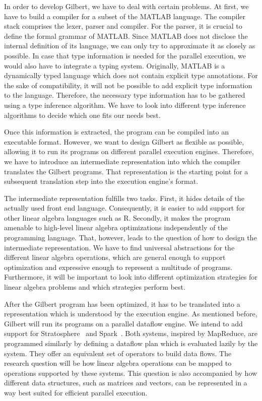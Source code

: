 In order to develop Gilbert, we have to deal with certain problems.
At first, we have to build a compiler for a subset of the MATLAB language.
The compiler stack comprises the lexer, parser and compiler.
For the parser, it is crucial to define the formal grammar of MATLAB.
Since MATLAB does not disclose the internal definition of its language, we can only try to approximate it as closely as possible.
In case that type information is needed for the parallel execution, we would also have to integrate a typing system.
Originally, MATLAB is a dynamically typed language which does not contain explicit type annotations.
For the sake of compatibility, it will not be possible to add explicit type information to the language.
Therefore, the necessary type information has to be gathered using a type inference algorithm.
We have to look into different type inference algorithms to decide which one fits our needs best.

Once this information is extracted, the program can be compiled into an executable format.
However, we want to design Gilbert as flexible as possible, allowing it to run its programs on different parallel execution engines.
Therefore, we have to introduce an intermediate representation into which the compiler translates the Gilbert programs.
That representation is the starting point for a subsequent translation step into the execution engine's format.

The intermediate representation fulfills two tasks.
First, it hides details of the actually used front end language.
Consequently, it is easier to add support for other linear algebra languages such as R.
Secondly, it makes the program amenable to high-level linear algebra optimizations independently of the programming language.
That, however, leads to the question of how to design the intermediate representation.
We have to find universal abstractions for the different linear algebra operations, which are general enough to support optimization and expressive enough to represent a multitude of programs.
Furthermore, it will be important to look into different optimization strategies for linear algebra problems and which strategies perform best.

After the Gilbert program has been optimized, it has to be translated into a representation which is understood by the execution engine.
As mentioned before, Gilbert will run its programs on a parallel dataflow engine.
We intend to add support for Stratosphere~\cite{alexandrov:2011a} and Spark~\cite{zaharia:2010a}.
Both systems, inspired by MapReduce, are programmed similarly by defining a dataflow plan which is evaluated lazily by the system.
They offer an equivalent set of operators to build data flows.
The research question will be how linear algebra operations can be mapped to operations supported by these systems.
This question is also accompanied by how different data structures, such as matrices and vectors, can be represented in a way best suited for efficient parallel execution.

